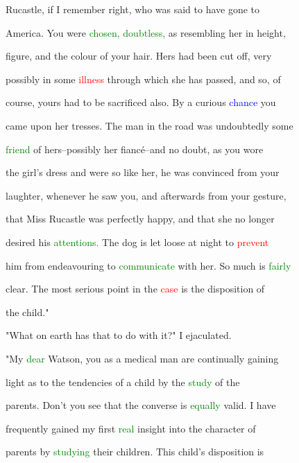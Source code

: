  Rucastle, if I remember right, who was said to have gone to

 America. You were \textcolor{green}{chosen,} \textcolor{green}{doubtless,} as resembling her in height,

 figure, and the colour of your hair. Hers had been cut off, very

 possibly in some \textcolor{red}{illness} through which she has passed, and so, of

 course, yours had to be sacrificed also. By a curious \textcolor{blue}{chance} you

 came upon her tresses. The man in the road was undoubtedly some

 \textcolor{green}{friend} of hers--possibly her fiancé--and no \textcolor{BurntOrange}{doubt,} as you wore

 the girl's dress and were so like her, he was \textcolor{BurntOrange}{convinced} from your

 \textcolor{BurntOrange}{laughter,} whenever he saw you, and afterwards from your gesture,

 that Miss Rucastle was perfectly \textcolor{BurntOrange}{happy,} and that she no longer

 desired his \textcolor{green}{attentions.} The dog is let loose at night to \textcolor{red}{prevent}

 him from endeavouring to \textcolor{green}{communicate} with her. So much is \textcolor{green}{fairly}

 clear. The most serious point in the \textcolor{red}{case} is the disposition of

 the \textcolor{BurntOrange}{child."}



 "What on earth has that to do with it?" I ejaculated.



 "My \textcolor{green}{dear} Watson, you as a \textcolor{BurntOrange}{medical} man are continually \textcolor{BurntOrange}{gaining}

 light as to the tendencies of a \textcolor{BurntOrange}{child} by the \textcolor{green}{study} of the

 parents. Don't you see that the converse is \textcolor{green}{equally} valid. I have

 frequently \textcolor{BurntOrange}{gained} my first \textcolor{green}{real} insight into the character of

 parents by \textcolor{green}{studying} their \textcolor{BurntOrange}{children.} This \textcolor{BurntOrange}{child's} disposition is

